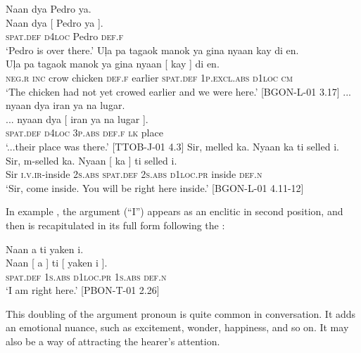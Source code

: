 \ea
\label{bkm:Ref442263283}
Naan  dya  Pedro   ya. \\\smallskip
\gll Naan  dya  [ Pedro   ya{ }]. \\
\textsc{spat.def}  \textsc{d4loc} {} Pedro  \textsc{def.f} \\
\glt ‘Pedro is over there.’
\z
\ea
Uļa  pa  tagaok  manok  ya  gina  nyaan  kay  di  en. \\\smallskip
\gll Uļa  pa  tagaok  manok  ya  gina  nyaan [{ }kay{ }] di  en. \\
\textsc{neg.r}  \textsc{inc}  crow  chicken  \textsc{def.f}  earlier  \textsc{spat.def}  1\textsc{p.excl.abs}  \textsc{d}1\textsc{loc}  \textsc{cm} \\
\glt ‘The chicken had not yet crowed earlier and we were here.’ [BGON-L-01 3.17]
\z
\ea
... nyaan  dya  iran  ya  na  lugar. \\\smallskip
\gll ... nyaan  dya  [ iran  ya  na  lugar{ }]. \\
{} \textsc{spat.def}  \textsc{d}4\textsc{loc} {} 3\textsc{p.abs}  \textsc{def.f}  \textsc{lk}  place \\
\glt ‘...their place was there.’ [TTOB-J-01 4.3]
\z
\ea
Sir,  melled  ka.  Nyaan  ka  ti selled  i. \\\smallskip
\gll Sir,  m-selled  ka.  Nyaan  [{ }ka{ }] ti\footnotemark{}  selled  i. \\
Sir  \textsc{i.v.ir}-inside  2\textsc{s.abs}  \textsc{spat.def}  2\textsc{s.abs}  \textsc{d}1\textsc{loc.pr}  inside  \textsc{def.n} \\
\glt ‘Sir, come inside. You will be right here inside.’ [BGON-L-01 4.11-12]
\z

In example , the argument (“I”) appears as an enclitic in second position, and then is recapitulated in its full form following the :

\ea
\label{bkm:Ref444840137}\label{bkm:Ref444864313}
Naan  a  ti  yaken  i. \\\smallskip
\gll Naan  [{ }a{ }] ti [ yaken  i{ }]. \\
\textsc{spat.def} 1\textsc{s.abs}  \textsc{d}1\textsc{loc.pr} {} 1\textsc{s.abs}  \textsc{def.n} \\
\glt ‘I am right here.’ [PBON-T-01 2.26]
\z

This doubling of the argument pronoun is quite common in conversation. It adds an emotional nuance, such as excitement, wonder, happiness, and so on. It may also be a way of attracting the hearer’s attention.

